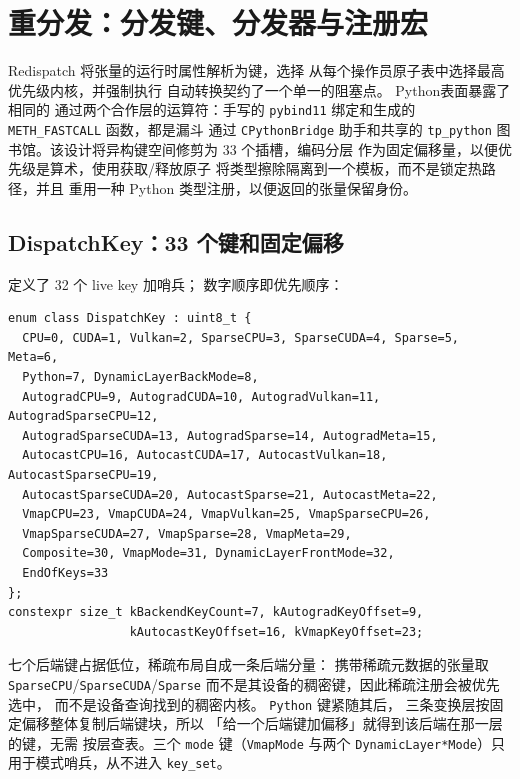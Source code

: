 \section{重分发：分发键、分发器与注册宏}
\label{sec:redispatch}

Redispatch 将张量的运行时属性解析为键，选择
从每个操作员原子表中选择最高优先级内核，并强制执行
自动转换契约了一个单一的阻塞点。 Python表面暴露了相同的
通过两个合作层的运算符：手写的 \texttt{pybind11}
绑定和生成的 \texttt{METH\_FASTCALL} 函数，都是漏斗
通过 \texttt{CPythonBridge} 助手和共享的 \texttt{tp\_python}
图书馆。该设计将异构键空间修剪为 33 个插槽，编码分层
作为固定偏移量，以便优先级是算术，使用获取/释放原子
将类型擦除隔离到一个模板，而不是锁定热路径，并且
重用一种 Python 类型注册，以便返回的张量保留身份。

\subsection{DispatchKey：33 个键和固定偏移}
\label{sec:dispatchkey}

定义了 32 个 live key 加哨兵；
数字顺序即优先顺序：

\begin{lstlisting}[caption={33 keys.}, label=lst:dispatchkey]
enum class DispatchKey : uint8_t {
  CPU=0, CUDA=1, Vulkan=2, SparseCPU=3, SparseCUDA=4, Sparse=5, Meta=6,
  Python=7, DynamicLayerBackMode=8,
  AutogradCPU=9, AutogradCUDA=10, AutogradVulkan=11, AutogradSparseCPU=12,
  AutogradSparseCUDA=13, AutogradSparse=14, AutogradMeta=15,
  AutocastCPU=16, AutocastCUDA=17, AutocastVulkan=18, AutocastSparseCPU=19,
  AutocastSparseCUDA=20, AutocastSparse=21, AutocastMeta=22,
  VmapCPU=23, VmapCUDA=24, VmapVulkan=25, VmapSparseCPU=26,
  VmapSparseCUDA=27, VmapSparse=28, VmapMeta=29,
  Composite=30, VmapMode=31, DynamicLayerFrontMode=32,
  EndOfKeys=33
};
constexpr size_t kBackendKeyCount=7, kAutogradKeyOffset=9,
                 kAutocastKeyOffset=16, kVmapKeyOffset=23;
\end{lstlisting}

七个后端键占据低位，稀疏布局自成一条后端分量：
携带稀疏元数据的张量取 \texttt{SparseCPU}/\texttt{SparseCUDA}/\texttt{Sparse}
而不是其设备的稠密键，因此稀疏注册会被优先选中，
而不是设备查询找到的稠密内核。 \texttt{Python} 键紧随其后，
三条变换层按固定偏移整体复制后端键块，所以
「给一个后端键加偏移」就得到该后端在那一层的键，无需
按层查表。三个 \texttt{mode} 键（\texttt{VmapMode} 与两个
\texttt{DynamicLayer*Mode}）只用于模式哨兵，从不进入
\texttt{key\_set}。


